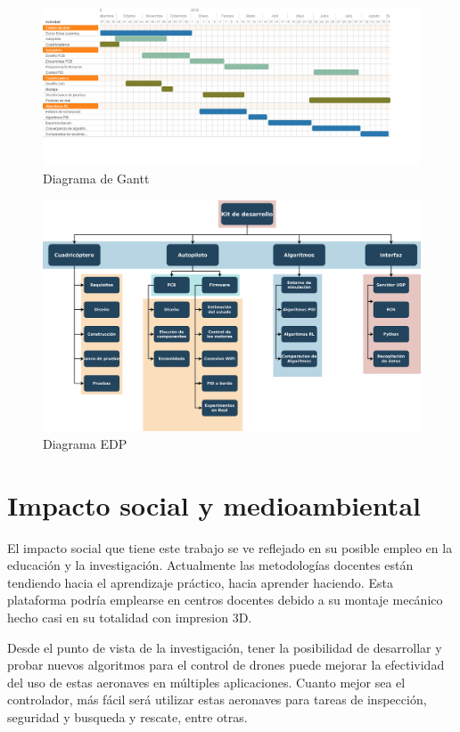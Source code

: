 \begin{figure}[htb!]
	\centering
	\includegraphics[width=\textwidth]{planificacion_ambiental/gantt}
	\caption{Diagrama de Gantt}
	\label{gantt}	
\end{figure}

\begin{figure}[htb!]
	\centering
	\includegraphics[width=\textwidth]{planificacion_ambiental/edp}
	\caption{Diagrama EDP}
	\label{EDP}	
\end{figure}



\chapter{Impacto social y medioambiental}

El impacto social que tiene este trabajo se ve reflejado en su posible empleo en la educación y la investigación. Actualmente las metodologías docentes están tendiendo hacia el aprendizaje práctico, hacia aprender haciendo. Esta plataforma podría emplearse en centros docentes debido a su montaje mecánico hecho casi en su totalidad con impresion 3D.

Desde el punto de vista de la investigación, tener la posibilidad de desarrollar y probar nuevos algoritmos para el control de drones puede mejorar la efectividad del uso de estas aeronaves en múltiples aplicaciones. Cuanto mejor sea el controlador, más fácil será utilizar estas aeronaves para tareas de inspección, seguridad y busqueda y rescate, entre otras.

